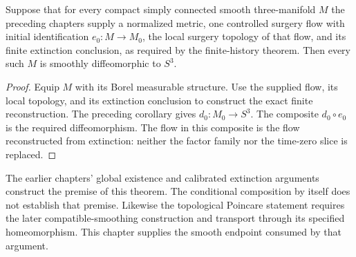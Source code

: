 \begin{theorem}
\label{thm:sphere-smooth-endpoint}
Suppose that for every compact simply connected smooth three-manifold
$M$ the preceding chapters supply a normalized metric, one controlled
surgery flow with initial identification $e_0:M\to M_0$, the local
surgery topology of that flow, and its finite extinction conclusion,
as required by the finite-history theorem.  Then every such $M$ is
smoothly diffeomorphic to $S^3$.
\end{theorem}

\begin{proof}
Equip $M$ with its Borel measurable structure.  Use the supplied
flow, its local topology, and its extinction conclusion to construct
the exact finite reconstruction.  The preceding corollary gives
$d_0:M_0\to S^3$.  The composite $d_0\circ e_0$ is the required
diffeomorphism.  The flow in this composite is the flow reconstructed
from extinction: neither the factor family nor the time-zero slice
is replaced.
\end{proof}

The earlier chapters' global existence and calibrated extinction
arguments construct the premise of this theorem.  The conditional
composition by itself does not establish that premise.  Likewise the
topological Poincare statement requires the later compatible-smoothing
construction and transport through its specified homeomorphism.
This chapter supplies the smooth endpoint consumed by that argument.
